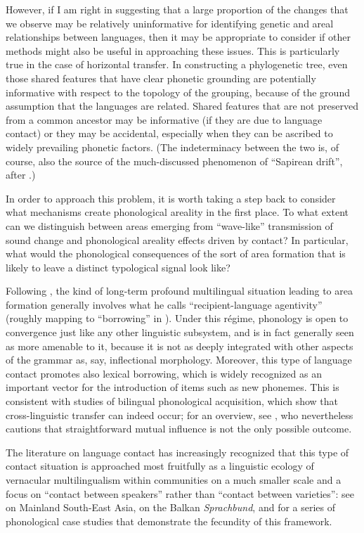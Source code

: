 \documentclass[output=paper,colorlinks,citecolor=brown]{langscibook}
\begin{document}
However, if I am right in suggesting that a large proportion of the changes that we observe may be relatively uninformative for identifying genetic and areal relationships between languages, then it may be appropriate to consider if other methods might also be useful in approaching these issues. This is particularly true in the case of horizontal transfer. In constructing a phylogenetic tree, even those shared features that have clear phonetic grounding are potentially informative with respect to the topology of the grouping, because of the ground assumption that the languages are related.  Shared features that are not preserved from a common ancestor may be informative (if they are due to language contact) or they may be accidental, especially when they can be ascribed to widely prevailing phonetic factors. (The indeterminacy between the two is, of course, also the source of the much\hyp discussed phenomenon of \enquote{Sapirean drift}, after \citealt{sapir21:_languag}.)

In order to approach this problem, it is worth taking a step back to consider what mechanisms create phonological areality in the first place.  To what extent can we distinguish between areas emerging from \enquote{wave\hyp like} transmission of sound change and phonological areality effects driven by contact? In particular, what would the phonological consequences of the sort of area formation that is likely to leave a distinct typological signal look like?

Following \textcite{winford2005contact}, the kind of long\hyp term profound multilingual situation leading to area formation generally involves what he calls
\enquote{recipient-language agentivity} (roughly mapping to \enquote{borrowing} in \citealt{thomason88:_languag}). Under this régime, phonology is open to convergence just like any other linguistic subsystem, and is in fact generally seen as more amenable to it, because it is not as deeply integrated with other aspects of the grammar as, say, inflectional morphology. Moreover, this type of language contact promotes also lexical borrowing, which is widely recognized as an important vector for the introduction of items such as new phonemes. This is consistent with studies of bilingual phonological acquisition, which show that cross-linguistic transfer can indeed occur; for an overview, see \textcite{kehoe2015cross}, who nevertheless cautions that straightforward mutual influence is not the only possible outcome.

The literature on language contact has increasingly recognized that this type of contact situation is approached most fruitfully as a linguistic ecology of vernacular multilingualism within communities on a much smaller scale and a focus on \enquote{contact between speakers} rather than \enquote{contact between varieties}: see \textcite{enfield2005areal} on Mainland South\hyp East Asia, \textcite{friedman2011balkan} on the Balkan \emph{Sprachbund}, and \textcite{dombrowski2013phonological} for a series of phonological case studies that demonstrate the fecundity of this framework.
\end{document}
